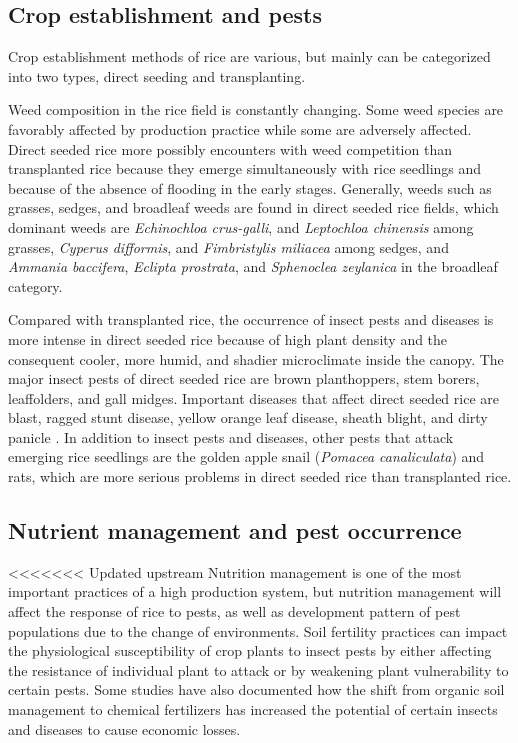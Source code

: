 \subsection*{Crop establishment and pests}

Crop establishment methods of rice are various, but mainly can be categorized into two types, direct seeding and transplanting. 

Weed composition in the rice field is constantly changing. Some weed species are favorably affected by production practice while some are adversely affected. Direct seeded rice more possibly encounters with weed competition than transplanted rice because they emerge simultaneously with rice seedlings and because of the absence of flooding in the early stages. Generally, weeds such as grasses, sedges, and broadleaf weeds are found in direct seeded rice fields, which dominant weeds are \textit{Echinochloa crus-galli}, and \textit{Leptochloa chinensis} among grasses, \textit{Cyperus difformis}, and \textit{Fimbristylis miliacea} among sedges, and \textit{Ammania baccifera}, \textit{Eclipta prostrata}, and \textit{Sphenoclea zeylanica} in the broadleaf category. 

Compared with transplanted rice, the occurrence of insect pests and diseases is more intense in direct seeded rice because of high plant density and the consequent cooler, more humid, and shadier microclimate inside the canopy. The major insect pests of direct seeded rice are brown planthoppers, stem borers, leaffolders, and gall midges. Important diseases that affect direct seeded rice are blast, ragged stunt disease, yellow orange leaf disease, sheath blight, and dirty panicle \citep{pongprasert1995insect}. In addition to insect pests and diseases, other pests that attack emerging rice seedlings are the golden apple snail (\textit{Pomacea canaliculata}) and rats, which are more serious problems in direct seeded rice than transplanted rice.


\subsection*{Nutrient management and pest occurrence}

<<<<<<< Updated upstream
Nutrition management is one of the most important practices of a high production system, but nutrition management will affect the response of rice to pests, as well as development pattern of pest populations due to the change of environments. Soil fertility practices can impact the physiological susceptibility of crop plants to insect pests by either affecting the resistance of individual plant to attack or by weakening plant vulnerability to certain pests. Some studies have also documented how the shift from organic soil management to chemical fertilizers has increased the potential of certain insects and diseases to cause economic losses.

